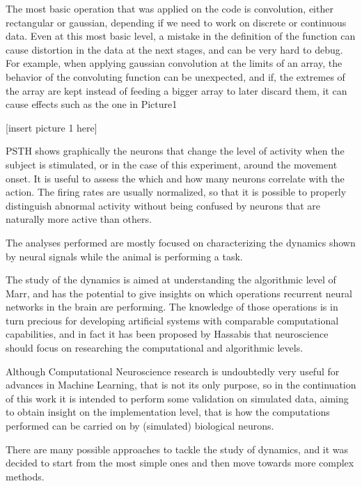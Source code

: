 The most basic operation that was applied on the code is convolution, either rectangular or gaussian, depending if we need to work on discrete or continuous data. Even at this most basic level, a mistake in the definition of the function can cause distortion in the data at the next stages, and can be very hard to debug. For example, when applying gaussian convolution at the limits of an array, the behavior of the convoluting function can be unexpected, and if, the extremes of the array are kept instead of feeding a bigger array to later discard them, it can cause effects such as the one in Picture1

[insert picture 1 here]

PSTH shows graphically the neurons that change the level of activity when the subject is stimulated, or in the case of this experiment, around the movement onset. It is useful to assess the which and how many neurons correlate with the action. The firing rates are usually normalized, so that it is possible to properly distinguish abnormal activity without being confused by neurons that are naturally more active than others.


The analyses performed are mostly focused on characterizing the dynamics shown by neural signals while the animal is performing a task. 

The study of the dynamics is aimed at understanding the algorithmic level of Marr, and has the potential to give insights on which operations recurrent neural networks in the brain are performing. The knowledge of those operations is in turn precious for developing artificial systems with comparable computational capabilities, and in fact it has been proposed by Hassabis \cite{hassabis2017neuroscience} that neuroscience should focus on researching the computational and algorithmic levels. 

Although Computational Neuroscience research is undoubtedly very useful for advances in Machine Learning, that is not its only purpose, so in the continuation of this work it is intended to perform some validation on simulated data, aiming to obtain insight on the implementation level, that is how the computations performed can be carried on by (simulated) biological neurons.

There are many possible approaches to tackle the study of dynamics, and it was decided to start from the most simple ones and then move towards more complex methods.

